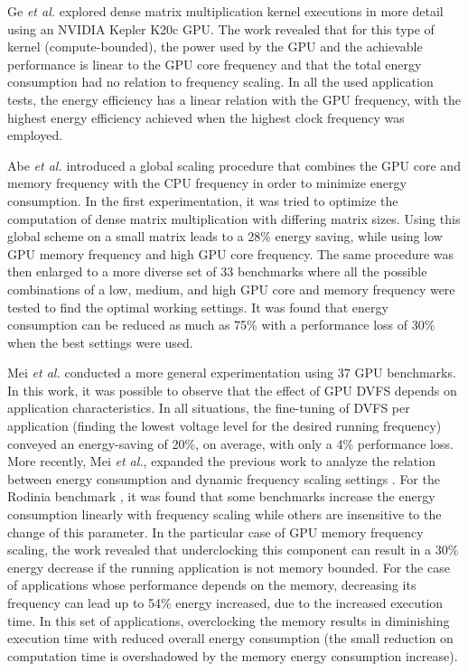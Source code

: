 Ge \textit{et al.} \cite{ge_effects_2013} explored dense matrix multiplication kernel executions in more detail using an NVIDIA Kepler K20c GPU.  The work revealed that for this type of kernel (compute-bounded), the power used by the GPU and the achievable performance is linear to the GPU core frequency and that the total energy consumption had no relation to frequency scaling. In all the used application tests, the energy efficiency has a linear relation with the GPU frequency, with the highest energy efficiency achieved when the highest clock frequency was employed.

Abe \textit{et al.} \cite{abe_power_2012} introduced a global scaling procedure that combines the GPU core and memory frequency with the CPU frequency in order to minimize energy consumption. In the first experimentation, it was tried to optimize the computation of dense matrix multiplication with differing matrix sizes. Using this global scheme on a small matrix leads to a 28\% energy saving, while using low GPU memory frequency and high GPU core frequency. The same procedure was then enlarged to a more diverse set of 33 benchmarks where all the possible combinations of a low, medium, and high GPU core and memory frequency were tested to find the optimal working settings. It was found that energy consumption can be reduced as much as 75\% with a performance loss of 30\% when the best settings were used. 

Mei \textit{et al.} \cite{mei_measurement_2013} conducted a more general experimentation using 37 GPU benchmarks. In this work, it was possible to observe that the effect of GPU DVFS depends on application characteristics. In all situations, the fine-tuning of DVFS per application (finding the lowest voltage level for the desired running frequency) conveyed an energy-saving of 20\%, on average, with only a 4\% performance loss. More recently, Mei  \textit{et al.}, expanded the previous work to analyze the relation between energy consumption and dynamic frequency scaling settings \cite{mei_survey_2016}. For the  Rodinia benchmark \cite{che_rodinia:_2009}, it was found that some benchmarks increase the energy consumption linearly with frequency scaling while others are insensitive to the change of this parameter. In the particular case of GPU memory frequency scaling, the work revealed that underclocking this component can result in a 30\% energy decrease if the running application is not memory bounded. For the case of applications whose performance depends on the memory, decreasing its frequency can lead up to 54\% energy increased, due to the increased execution time. In this set of applications, overclocking the memory results in diminishing execution time with reduced overall energy consumption (the small reduction on computation time is overshadowed by the memory energy consumption increase). 

